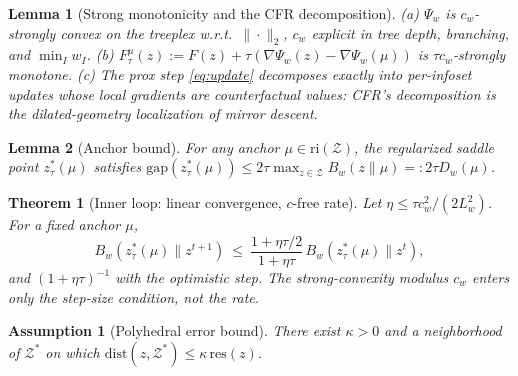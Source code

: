 \documentclass{article}
\newtheorem{theorem}{Theorem}
\newtheorem{lemma}{Lemma}
\newtheorem{assumption}{Assumption}
\newcommand{\Z}{\mathcal{Z}}
\newcommand{\Zs}{\mathcal{Z}^*}
\newcommand{\gap}{\mathrm{gap}}
\newcommand{\dist}{\mathrm{dist}}
\newcommand{\res}{\mathrm{res}}
\newcommand{\Bw}{B_w}
\newcommand{\Psiw}{\Psi_w}
\begin{document}
\begin{lemma}[Strong monotonicity and the CFR decomposition]
\label{lem:decomp}
(a) $\Psiw$ is $c_w$-strongly convex on the treeplex w.r.t.\
$\|\cdot\|_2$, $c_w$ explicit in tree depth, branching, and
$\min_I w_I$.
(b) $F^{\mu}_\tau(z) := F(z)+\tau(\nabla\Psiw(z)-\nabla\Psiw(\mu))$ is
$\tau c_w$-strongly monotone.
(c) The prox step \eqref{eq:update} decomposes exactly into per-infoset
updates whose local gradients are counterfactual values: CFR's
decomposition \emph{is} the dilated-geometry localization of mirror
descent.
\end{lemma}

\begin{lemma}[Anchor bound]
\label{lem:anchor}
For any anchor $\mu\in\mathrm{ri}(\Z)$, the regularized saddle point
$z^*_\tau(\mu)$ satisfies
$\gap(z^*_\tau(\mu)) \le 2\tau \max_{z\in\Z}\Bw(z\|\mu) =: 2\tau D_w(\mu)$.
\end{lemma}

\begin{theorem}[Inner loop: linear convergence, $c$-free rate]
\label{thm:inner}
Let $\eta\le \tau c_w^2/(2L_w^2)$. For a fixed anchor $\mu$,
\[
  \Bw(z^*_\tau(\mu)\|z^{t+1})\ \le\ \frac{1+\eta\tau/2}{1+\eta\tau}\,
  \Bw(z^*_\tau(\mu)\|z^{t}),
\]
and $(1+\eta\tau)^{-1}$ with the optimistic step.  The strong-convexity
modulus $c_w$ enters only the step-size condition, \emph{not} the rate.
\end{theorem}

\begin{assumption}[Polyhedral error bound]
\label{ass:eb}
There exist $\kappa>0$ and a neighborhood of $\Zs$ on which
$\dist(z,\Zs)\le\kappa\,\res(z)$.
\end{assumption}
\end{document}
